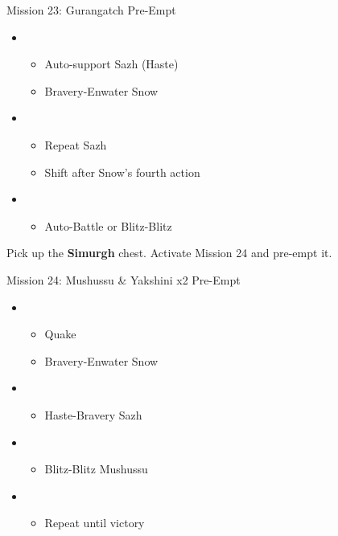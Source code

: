 	\begin{battle}[0:22]{Mission 23: Gurangatch Pre-Empt}
		\begin{itemize}
			\item \third
			      \begin{itemize}
				      \item Auto-support Sazh (Haste)
				      \item Bravery-Enwater Snow
			      \end{itemize}
			\item \first
			      \begin{itemize}
				      \item Repeat Sazh
				      \item Shift after Snow's fourth action
			      \end{itemize}
			\item \fourth
			      \begin{itemize}
				      \item Auto-Battle or Blitz-Blitz
			      \end{itemize}
		\end{itemize}
	\end{battle}

Pick up the \textbf{Simurgh} chest.
Activate Mission 24 and pre-empt it.

	\begin{battle}[0:28]{Mission 24: Mushussu \& Yakshini x2 Pre-Empt}
		\begin{itemize}
			\item \third
			      \begin{itemize}
				      \item Quake
				      \item Bravery-Enwater Snow
			      \end{itemize}
			\item \first
			      \begin{itemize}
				      \item Haste-Bravery Sazh
			      \end{itemize}
			\item \sixth
			      \begin{itemize}
				      \item Blitz-Blitz Mushussu
			      \end{itemize}
			\item \fourth
			      \begin{itemize}
				      \item Repeat until victory
			      \end{itemize}
		\end{itemize}
	\end{battle}

